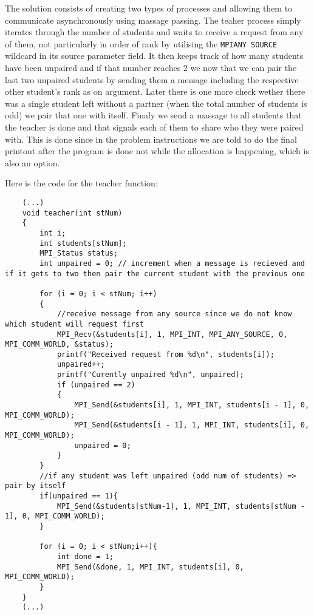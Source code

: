 \documentclass[a4paper,11pt]{article}
\begin{document}
The solution consists of creating two types of processes and allowing them to communicate asynchronously using massage passing. The teaher process simply iterates through the number of students and waits to receive a request from any of them, not particularly in order of rank by utilising the {\tt MPI\textunderscore ANY \textunderscore SOURCE} wildcard in its source parameter field. It then keeps track of how many students have been unpaired and if that number reaches 2 we now that we can pair the last two unpaired students by sending them a message including the respective other student's rank as on argument. Later there is one more check wether there was a single student left without a partner (when the total number of students is odd) we pair that one with itself. Finaly we send a massage to all students that the teacher is done and that signals each of them to share who they were paired with. This is done since in the problem instructions we are told to do the final printout after the program is done not while the allocation is happening, which is also an option.

Here is the code for the teacher function:

\begin{verbatim}
    (...)
    void teacher(int stNum)
    {
        int i;
        int students[stNum];
        MPI_Status status;
        int unpaired = 0; // increment when a message is recieved and if it gets to two then pair the current student with the previous one
    
        for (i = 0; i < stNum; i++)
        {
            //receive message from any source since we do not know which student will request first
            MPI_Recv(&students[i], 1, MPI_INT, MPI_ANY_SOURCE, 0, MPI_COMM_WORLD, &status);
            printf("Received request from %d\n", students[i]);
            unpaired++;
            printf("Curently unpaired %d\n", unpaired);
            if (unpaired == 2)
            {
                MPI_Send(&students[i], 1, MPI_INT, students[i - 1], 0, MPI_COMM_WORLD);
                MPI_Send(&students[i - 1], 1, MPI_INT, students[i], 0, MPI_COMM_WORLD);
                unpaired = 0;
            }
        }
        //if any student was left unpaired (odd num of students) => pair by itself
        if(unpaired == 1){
            MPI_Send(&students[stNum-1], 1, MPI_INT, students[stNum - 1], 0, MPI_COMM_WORLD);
        }
    
        for (i = 0; i < stNum;i++){
            int done = 1;
            MPI_Send(&done, 1, MPI_INT, students[i], 0, MPI_COMM_WORLD);
        }
    }
    (...)
\end{verbatim}
\end{document}
